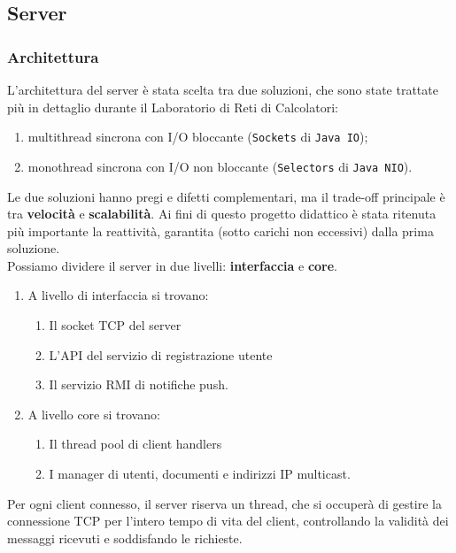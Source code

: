 \subsection{Server}

\subsubsection{Architettura}
L'architettura del server è stata scelta tra due soluzioni, che sono state trattate più in dettaglio durante il Laboratorio di Reti di Calcolatori:

\begin{enumerate}
	\item multithread sincrona con I/O bloccante (\texttt{Sockets} di \texttt{Java IO});
	\item monothread sincrona con I/O non bloccante (\texttt{Selectors} di \texttt{Java NIO}).
\end{enumerate}

Le due soluzioni hanno pregi e difetti complementari, ma il trade-off principale è tra \textbf{velocità} e \textbf{scalabilità}. Ai fini di questo progetto didattico è stata ritenuta più importante la reattività, garantita (sotto carichi non eccessivi) dalla prima soluzione.
\medskip \\
Possiamo dividere il server in due livelli: \textbf{interfaccia} e \textbf{core}.

\begin{enumerate}
	\item A livello di interfaccia si trovano:
		\begin{enumerate}
			\item Il socket TCP del server
			\item L'API del servizio di registrazione utente
			\item Il servizio RMI di notifiche push.
		\end{enumerate}
	\item A livello core si trovano:
		\begin{enumerate}
			\item Il thread pool di client handlers
			\item I manager di utenti, documenti e indirizzi IP multicast.
		\end{enumerate}
\end{enumerate}

Per ogni client connesso, il server riserva un thread, che si occuperà di gestire la connessione TCP per l'intero tempo di vita del client, controllando la validità dei messaggi ricevuti e soddisfando le richieste.

